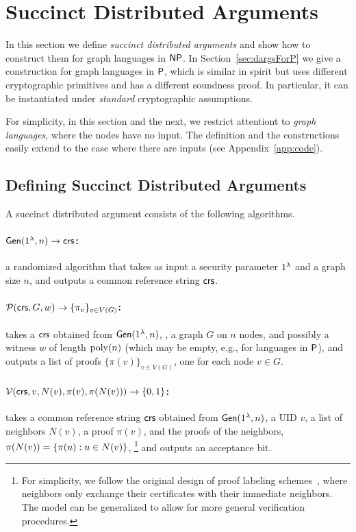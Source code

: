 \section{Succinct Distributed Arguments}\label{sec:dargs}
In this section we define \emph{succinct distributed arguments} and show how to construct them for graph languages in ${\mathsf{NP}}$.
In Section~\ref{sec:dargsForP} we give a construction for graph languages in ${\mathsf{P}}$, which is similar in spirit
but uses different cryptographic primitives and has a different soundness proof. In particular, it can be instantiated under \emph{standard} cryptographic assumptions.

For simplicity, in this section and the next,
we restrict attentiont to \emph{graph languages},
where the nodes have no input.
The definition and the constructions easily extend to the case where there are inputs
(see Appendix~\ref{app:code}).

\subsection{Defining Succinct Distributed Arguments}
\label{sec:def}
A succinct distributed argument consists of the following algorithms.

\paragraph{$\mathsf{Gen}(1^\lambda, n)\to \mathit{ \mathsf{crs} }$:} a randomized algorithm that takes as input a security parameter $1^\lambda$ and a graph size $n$, and outputs a common reference string $\mathit{ \mathsf{crs} }$.

\paragraph{$\mathcal{P}(\mathit{ \mathsf{crs} }, G, w)\to \{\pi_v\}_{v\in V(G)}$:}
takes a $\mathit{ \mathsf{crs} }$ obtained from $\mathsf{Gen}(1^{\lambda}, n)$,
, %
a graph $G$ on $n$ nodes, and possibly a witness $w$ of length $\operatorname{poly}(n)$ (which may be empty, e.g., for languages in ${\mathsf{P}}$),
and outputs a list of proofs $\{\pi(v)\}_{v\in V(G)}$,
one for each node $v \in G$.

\paragraph{$\mathcal{V}(\mathit{ \mathsf{crs} }, v, N(v), \pi(v), \pi(N(v)) )\to \{0,1\}$:}
takes a common reference string $\mathsf{crs}$ obtained from $\mathsf{Gen}(1^{\lambda}, n)$,
a UID $v$, a list of neighbors $N(v)$, a proof $\pi(v)$,
and the proofs of the neighbors, $\pi(N(v)) = \left \{{ \pi(u) : u \in N(v) } \right \}$,%
\footnote{For simplicity, we follow the original design of proof labeling schemes~\cite{korman2005proof},
where neighbors only exchange their certificates with their immediate neighbors.
The model can be generalized to allow for more general verification procedures.}
and outputs an acceptance bit.

